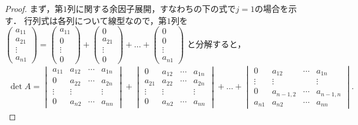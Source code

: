 \begin{leftbar}
\begin{proof}
まず，第$1$列に関する余因子展開，すなわちの下の式で$j=1$の場合を示す．
行列式は各列について線型なので，第$1$列を
$\begin{pmatrix} a_{11} \\ a_{21} \\ \vdots \\ a_{n1} \end{pmatrix}
= \begin{pmatrix} a_{11} \\ 0 \\ \vdots \\ 0 \end{pmatrix}
+ \begin{pmatrix} 0 \\ a_{21} \\ \vdots \\ 0 \end{pmatrix}
+ \dots
+ \begin{pmatrix} 0 \\ 0 \\ \vdots \\ a_{n1} \end{pmatrix}$
と分解すると，
\begin{align*}
  \det A =
  \begin{vmatrix}
    a_{11} & a_{12} & \cdots & a_{1n} \\
    0      & a_{22} & \cdots & a_{2n} \\
    \vdots & \vdots &        & \vdots \\
    0      & a_{n2} & \cdots & a_{nn}
  \end{vmatrix}
  +
  \begin{vmatrix}
    0      & a_{12} & \cdots & a_{1n} \\
    a_{21} & a_{22} & \cdots & a_{2n} \\
    \vdots & \vdots &        & \vdots \\
    0      & a_{n2} & \cdots & a_{nn}
  \end{vmatrix}
  + \dots +
  \begin{vmatrix}
    0      & a_{12}     & \cdots & a_{1n} \\
    \vdots & \vdots     &        & \vdots \\
    0      & a_{n-1,2}  & \cdots & a_{n-1,n} \\
    a_{n1} & a_{n2}     & \cdots & a_{nn}
  \end{vmatrix}.

\end{align*}
\end{proof}
\end{leftbar}
